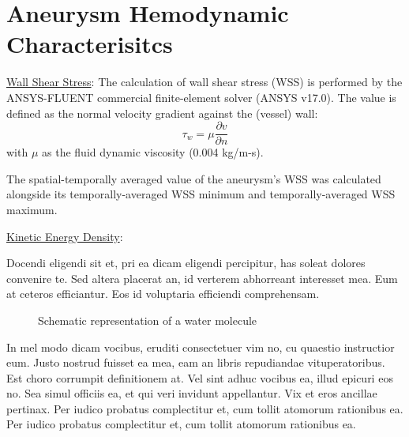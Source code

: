 \section{Aneurysm Hemodynamic Characterisitcs}\label{CHAPTER1_SECTION3}


\underline{Wall Shear Stress}: 
The calculation of wall shear stress (WSS) is performed by the ANSYS-FLUENT commercial finite-element solver (ANSYS v17.0). The value is defined as the normal velocity gradient against the (vessel) wall:
\begin{equation} \label{WSS}
\tau_w = \mu\frac{\partial v}{\partial n}
\end{equation}
with $\mu$ as the fluid dynamic viscosity (0.004 kg/m-s). 

The spatial-temporally averaged value of the aneurysm's WSS was calculated alongside its temporally-averaged WSS minimum and temporally-averaged WSS maximum. 

\underline{Kinetic Energy Density}:



Docendi eligendi sit et, pri ea dicam eligendi percipitur, has soleat 
dolores convenire te. Sed altera placerat an, id verterem abhorreant 
interesset mea. Eum at ceteros efficiantur. Eos id voluptaria efficiendi 
comprehensam. \cite{HPL_DGEMM_01,HPL_DGEMM_02}

\begin{figure}[hbt]
  \begin{center}
  \end{center}
  \caption{Schematic representation of a water molecule}
  \label{CHAPTER1_FIG03}
\end{figure}

In mel modo dicam vocibus, eruditi consectetuer vim no, cu quaestio 
instructior eum. Justo nostrud fuisset ea mea, eam an libris repudiandae 
vituperatoribus. Est choro corrumpit definitionem at. Vel sint adhuc vocibus 
ea, illud epicuri eos no. Sea simul officiis ea, et qui veri invidunt 
appellantur. Vix et eros ancillae pertinax. 
\cite{GROMACS4,GULP_01,GULP_02,HYPRE_01,LAMMPS_01}
Per iudico probatus complectitur et, cum tollit atomorum rationibus ea.
Per iudico probatus complectitur et, cum tollit atomorum rationibus ea.

